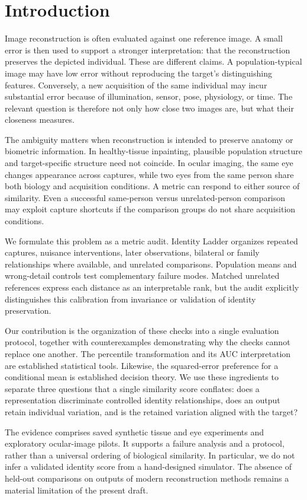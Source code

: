 \documentclass[10pt,twocolumn,letterpaper]{article}
\begin{document}
\section{Introduction}
Image reconstruction is often evaluated against one reference image. A small error is then used to support a stronger interpretation: that the reconstruction preserves the depicted individual. These are different claims. A population-typical image may have low error without reproducing the target's distinguishing features. Conversely, a new acquisition of the same individual may incur substantial error because of illumination, sensor, pose, physiology, or time. The relevant question is therefore not only how close two images are, but what their closeness measures.

The ambiguity matters when reconstruction is intended to preserve anatomy or biometric information. In healthy-tissue inpainting, plausible population structure and target-specific structure need not coincide. In ocular imaging, the same eye changes appearance across captures, while two eyes from the same person share both biology and acquisition conditions. A metric can respond to either source of similarity. Even a successful same-person versus unrelated-person comparison may exploit capture shortcuts if the comparison groups do not share acquisition conditions.

We formulate this problem as a metric audit. Identity Ladder organizes repeated captures, nuisance interventions, later observations, bilateral or family relationships where available, and unrelated comparisons. Population means and wrong-detail controls test complementary failure modes. Matched unrelated references express each distance as an interpretable rank, but the audit explicitly distinguishes this calibration from invariance or validation of identity preservation.

Our contribution is the organization of these checks into a single evaluation protocol, together with counterexamples demonstrating why the checks cannot replace one another. The percentile transformation and its AUC interpretation are established statistical tools. Likewise, the squared-error preference for a conditional mean is established decision theory. We use these ingredients to separate three questions that a single similarity score conflates: does a representation discriminate controlled identity relationships, does an output retain individual variation, and is the retained variation aligned with the target?

The evidence comprises saved synthetic tissue and eye experiments and exploratory ocular-image pilots. It supports a failure analysis and a protocol, rather than a universal ordering of biological similarity. In particular, we do not infer a validated identity score from a hand-designed simulator. The absence of held-out comparisons on outputs of modern reconstruction methods remains a material limitation of the present draft.
\end{document}
